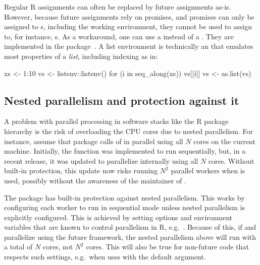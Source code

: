 Regular R assignments can often be replaced by future assignments
as-is.  However, because future assignments rely on promises, and
promises can only be assigned to s, including the
working environment, they cannot be used to assign to, for
instance, s.  As a workaround, one can use a  instead of a .  They are implemented in
the  package~\citep{CRAN:listenv}.  A list
environment is technically an  that emulates most 
properties of a \emph{list}, including indexing as in:
\begin{example}
xs <- 1:10
vs <- listenv::listenv()
for (i in seq_along(xs)) {
  vs[[i]] %
}
vs <- as.list(vs)
\end{example}


\subsection{Nested parallelism and protection against it}
\label{protection-against-nested-parallelism}

A problem with parallel processing in software stacks like the R
package hierarchy is the risk of overloading the CPU cores due to
nested parallelism. For instance, assume that package  calls
 of  in parallel using all $N$ cores on the
current machine. Initially, the  function was
implemented to run sequentially, but, in a recent release, it was
updated to parallelize internally using all $N$ cores.  Without
built-in protection, this update now risks running $N^2$ parallel
workers when  is used, possibly without the awareness of the
maintainer of .

The  package has built-in protection against nested
parallelism. This works by configuring each worker to run in
sequential mode unless nested parallelism is explicitly configured.
This is achieved by setting options and environment variables that are
known to control parallelism in R,
e.g.\ .  Because of this, if 
and  parallelize using the future framework, the nested
parallelism above will run with a total of $N$ cores, not $N^2$ cores.
This will also be true for non-future code that respects such
settings, e.g.\ when  uses  with
the default
 argument.

